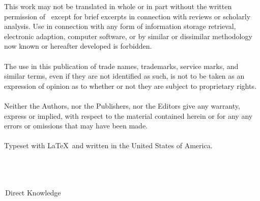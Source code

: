 \begin{titlepage}
This work may not be translated in whole or in part without the written permission of \publisher\ except for brief excerpts in 
connection with reviews or scholarly analysis.  Use in connection with any form of information storage retrieval, 
electronic adaption, computer software, or by similar or dissimilar methodology now known or hereafter developed is forbidden. \\ \\ 
The use in this publication of trade names, trademarks, service marks, and similar terms, even if they are not identified as 
such, is not to be taken as an expression of opinion as to whether or not they are subject to proprietary rights. \\ \\ 
Neither the Authors, nor the Publishers, nor the Editors give any warranty, express or implied, with respect to the material 
contained herein or for any any errors or omissions that may have been made.  \\ \\  
Typeset with \LaTeX \, and written in the United States of America.  
\\[2pt] \HRule \\[0.5cm]  \authname \\ \cred \\ \website
\begin{flushleft}
\large{\,Direct Knowledge}
\end{flushleft}
\end{titlepage}


